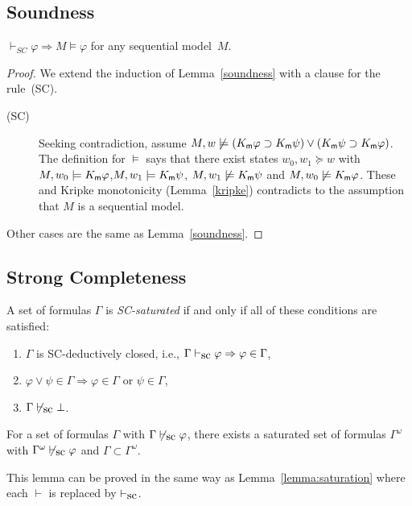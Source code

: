 \subsection{Soundness}
\begin{lemma}
 \label{sc-sound}
 $\vdash_{SC} \varphi \Rightarrow M\models\varphi$ for any sequential model~$M$.
\end{lemma}
\begin{proof}
 We extend the induction of Lemma~\ref{soundness} with a clause for the rule~(SC).
\begin{description}
 \item[(SC)] Seeking contradiction, assume $M, w\not\models (K_{\sf m} \varphi\supset
	    K_{\sf m} \psi)\vee (K_{\sf m} \psi\supset K_{\sf m} \varphi)$.
	    The definition for $\models$ says that there exist states $w_0, w_1\succeq w$
	    with $M, w_0\models K_{\sf m}\varphi$,\quad $M, w_1\models K_{\sf m}\psi$,\quad
	    $M, w_1\not\models K_{\sf m}\psi$ and $M, w_0\not\models K_{\sf m}\varphi$.
	    These and Kripke monotonicity (Lemma~\ref{kripke}) contradicts to the
	    assumption that $M$ is a sequential model.
\end{description}
Other cases are the same as Lemma~\ref{soundness}.
\end{proof}
\subsection{Strong Completeness}
\begin{definition}
 A set of formulas $\Gamma$ is \textit{SC-saturated} if and only if all of these
 conditions are satisfied:
\begin{enumerate}
 \item $\Gamma$ is SC-deductively closed, i.e., $\Gamma\vdash_{\mbox{\rm sc}}\varphi\Rightarrow \varphi\in\Gamma$,
 \item $\varphi\vee\psi\in\Gamma \Rightarrow \varphi\in\Gamma$ or $\psi\in\Gamma$,
 \item $\Gamma\not\vdash_{\mbox{\rm sc}}\bot$.
\end{enumerate}
\end{definition}

\begin{lemma}
\label{sc-saturation}
 For a set of formulas $\Gamma$ with $\Gamma\not\vdash_{\mbox{\rm sc}}\varphi$, there exists a saturated
 set of formulas $\Gamma^\omega$ with $\Gamma^\omega\not\vdash_{\mbox{\rm sc}}\varphi$
 and $\Gamma\subset \Gamma^\omega$.
\end{lemma}
\noindent 
This lemma can be proved in the same way as Lemma~\ref{lemma:saturation} where each $\vdash$ is replaced by $\vdash_{\mbox{\rm sc}}$.

